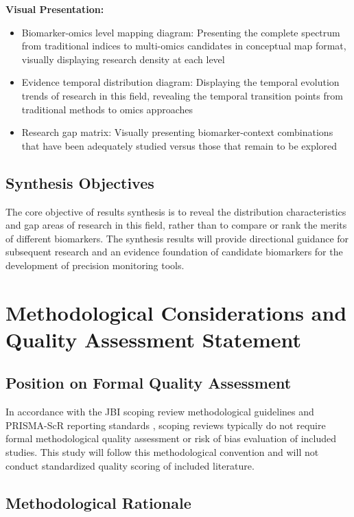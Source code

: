 \documentclass[12pt,a4paper]{article}
\begin{document}
\textbf{Visual Presentation:}

\begin{itemize}
\item Biomarker-omics level mapping diagram: Presenting the complete spectrum from traditional indices to multi-omics candidates in conceptual map format, visually displaying research density at each level
\item Evidence temporal distribution diagram: Displaying the temporal evolution trends of research in this field, revealing the temporal transition points from traditional methods to omics approaches
\item Research gap matrix: Visually presenting biomarker-context combinations that have been adequately studied versus those that remain to be explored
\end{itemize}

\subsection{Synthesis Objectives}

The core objective of results synthesis is to reveal the distribution characteristics and gap areas of research in this field, rather than to compare or rank the merits of different biomarkers. The synthesis results will provide directional guidance for subsequent research and an evidence foundation of candidate biomarkers for the development of precision monitoring tools.

\section{Methodological Considerations and Quality Assessment Statement}

\subsection{Position on Formal Quality Assessment}

In accordance with the JBI scoping review methodological guidelines and PRISMA-ScR reporting standards \citep{peters2020jbi,tricco2018prisma}, scoping reviews typically do not require formal methodological quality assessment or risk of bias evaluation of included studies. This study will follow this methodological convention and will not conduct standardized quality scoring of included literature.

\subsection{Methodological Rationale}
\end{document}
